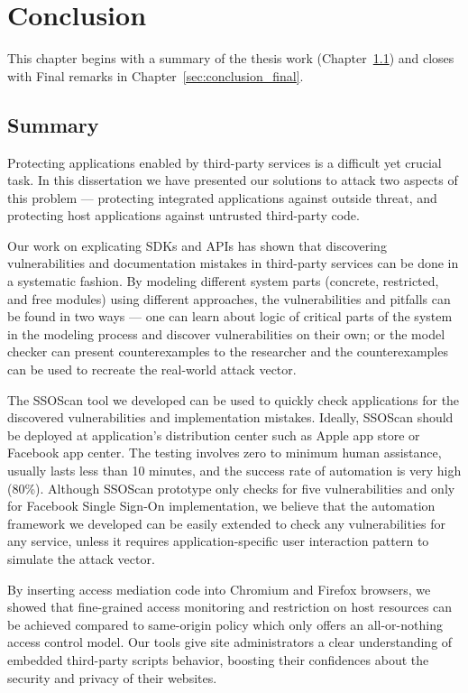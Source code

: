 \chapter{Conclusion}

This chapter begins with a summary of the thesis work (Chapter~\ref{sec:conclusion_summary}) and closes with Final remarks in Chapter~\ref{sec:conclusion_final}.

\section{Summary}
\label{sec:conclusion_summary}

Protecting applications enabled by third-party services is a difficult yet crucial task.  In this dissertation we have presented our solutions to attack two aspects of this problem --- protecting integrated applications against outside threat, and protecting host applications against untrusted third-party code.

Our work on explicating SDKs and APIs has shown that discovering vulnerabilities and documentation mistakes in third-party services can be done in a systematic fashion.  By modeling different system parts (concrete, restricted, and free modules) using different approaches, the vulnerabilities and pitfalls can be found in two ways --- one can learn about logic of critical parts of the system in the modeling process and discover vulnerabilities on their own; or the model checker can present counterexamples to the researcher and the counterexamples can be used to recreate the real-world attack vector.

The SSOScan tool we developed can be used to quickly check applications for the discovered vulnerabilities and implementation mistakes.  Ideally, SSOScan should be deployed at application's distribution center such as Apple app store or Facebook app center.  The testing involves zero to minimum human assistance, usually lasts less than 10 minutes, and the success rate of automation is very high (80\%).  Although SSOScan prototype only checks for five vulnerabilities and only for Facebook Single Sign-On implementation, we believe that the automation framework we developed can be easily extended to check any vulnerabilities for any service, unless it requires application-specific user interaction pattern to simulate the attack vector.

By inserting access mediation code into Chromium and Firefox browsers, we showed that fine-grained access monitoring and restriction on host resources can be achieved compared to same-origin policy which only offers an all-or-nothing access control model.  Our tools give site administrators a clear understanding of embedded third-party scripts behavior, boosting their confidences about the security and privacy of their websites.

